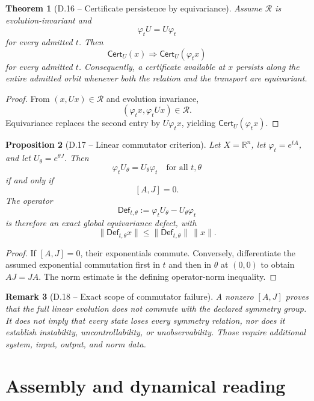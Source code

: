 \documentclass[11pt,letterpaper]{article}
\theoremstyle{dynamicsstyle}
\newtheorem{theorem}{Theorem}[section]
\newtheorem{proposition}[theorem]{Proposition}
\newtheorem{remark}[theorem]{Remark}
\newcommand{\R}{\mathbb{R}}
\newcommand{\Flow}{\varphi}
\newcommand{\Cert}{\mathsf{Cert}}
\newcommand{\Defect}{\mathsf{Def}}
\begin{document}
\begin{theorem}[D.16 -- Certificate persistence by equivariance]\label{thm:persistence}
Assume $\mathcal R$ is evolution-invariant and
\[
\Flow_tU=U\Flow_t
\]
for every admitted $t$.  Then
\[
\Cert_U(x)\Longrightarrow\Cert_U(\Flow_tx)
\]
for every admitted $t$.  Consequently, a certificate available at $x$ persists along the entire admitted orbit whenever both the relation and the transport are equivariant.
\end{theorem}

\begin{proof}
From $(x,Ux)\in\mathcal R$ and evolution invariance,
\[
(\Flow_tx,\Flow_tUx)\in\mathcal R.
\]
Equivariance replaces the second entry by $U\Flow_tx$, yielding $\Cert_U(\Flow_tx)$.
\end{proof}

\begin{proposition}[D.17 -- Linear commutator criterion]\label{prop:commutator}
Let $X=\R^n$, let $\Flow_t=e^{tA}$, and let $U_\theta=e^{\theta J}$.  Then
\[
\Flow_tU_\theta=U_\theta\Flow_t
\quad\text{for all }t,\theta
\]
if and only if
\[
[A,J]=0.
\]
The operator
\[
\Defect_{t,\theta}
:=\Flow_tU_\theta-U_\theta\Flow_t
\]
is therefore an exact global equivariance defect, with
\[
\|\Defect_{t,\theta}x\|
\le \|\Defect_{t,\theta}\|\,\|x\|.
\]
\end{proposition}

\begin{proof}
If $[A,J]=0$, their exponentials commute.  Conversely, differentiate the assumed exponential commutation first in $t$ and then in $\theta$ at $(0,0)$ to obtain $AJ=JA$.  The norm estimate is the defining operator-norm inequality.
\end{proof}

\begin{remark}[D.18 -- Exact scope of commutator failure]
A nonzero $[A,J]$ proves that the full linear evolution does not commute with the declared symmetry group.  It does not imply that every state loses every symmetry relation, nor does it establish instability, uncontrollability, or unobservability.  Those require additional system, input, output, and norm data.
\end{remark}

\section{Assembly and dynamical reading}\label{sec:assembly}
\end{document}
